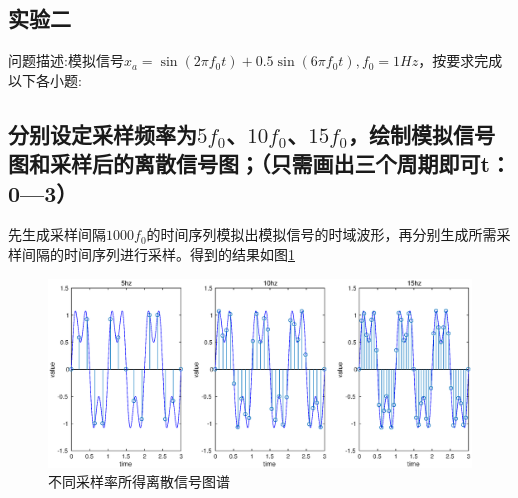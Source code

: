 \documentclass[UTF8]{article}
\begin{document}
\begin{CJK}{UTF8}{gkai}
\section{实验二}
问题描述:模拟信号$x_a=\sin(2\pi f_0t)+0.5\sin(6\pi f_0t),f_0=1Hz$，按要求完成以下各小题:
\subsection{分别设定采样频率为$5f_0$、$10f_0$、$15f_0$，绘制模拟信号图和采样后的离散信号图；（只需画出三个周期即可t：0—3）}
先生成采样间隔$1000f_0$的时间序列模拟出模拟信号的时域波形，再分别生成所需采样间隔的时间序列进行采样。得到的结果如图\ref{pro2_fig1}
\begin{figure}
  \includegraphics[scale=0.3]{pro2_subpro1.eps}
  \caption{不同采样率所得离散信号图谱}
  \label{pro2_fig1}
\end{figure}


\end{CJK}
\end{document}
